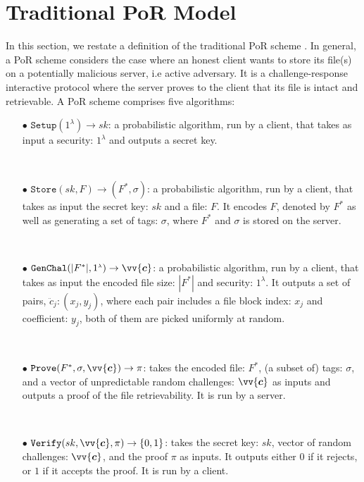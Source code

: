 \section {Traditional PoR Model}\label{PoR-Model}

In this section, we restate a  definition of the traditional PoR scheme \cite{DBLP:conf/asiacrypt/ShachamW08}. In general, a PoR scheme considers the case where an honest client wants to store its file(s) on a  potentially malicious server, i.e active adversary. It is a challenge-response interactive protocol where the server proves to the client that its file is intact and retrievable. A PoR scheme comprises five algorithms: 

\begin{itemize}
\item[$\bullet$] $\mathtt{Setup}(1^{\scriptscriptstyle\lambda})\rightarrow sk$:  a probabilistic algorithm, run by a client, that takes as input a security:  $1^{\scriptscriptstyle\lambda}$ and outputs a secret key.

\

\item[$\bullet$] $\mathtt{Store}(sk,F)\rightarrow (F^{*}, \sigma)$: a probabilistic algorithm, run by a client, that takes as input the secret key: $sk$ and a file: $F$. It encodes $F$, denoted by $F^{*}$ as well as generating a set of  tags: $\sigma$, where $F^{*}$ and  $\sigma$ is stored on the server.

\

\item[$\bullet$] $\mathtt{GenChal}(|F^{*}|, 1^{\scriptscriptstyle\lambda})\rightarrow \vv{\bm{c}}$: a probabilistic algorithm, run by a client, that takes as input the encoded file size: $|F^{*}|$ and security:  $1^{\scriptscriptstyle\lambda}$. It outputs a set of pairs, $\ddot{c}_{\scriptscriptstyle j}:(x_{\scriptscriptstyle j},y_{\scriptscriptstyle j})$, where each pair includes a file block index: $x_{\scriptscriptstyle j}$ and coefficient: $y_{\scriptscriptstyle j}$, both of them are picked uniformly at random.

\

\item[$\bullet$] $\mathtt{Prove}(F^{*}, \sigma, \vv{\bm{c}})\rightarrow \pi$:  takes the encoded file: $F^{*}$, (a subset of) tags: $\sigma$, and a vector of unpredictable random challenges: $\vv{\bm{c}}$ as inputs and outputs a proof of the file retrievability. It is run by a server.

\

\item[$\bullet$] $\mathtt{Verify}(sk,\vv{\bm{c}}, \pi)\rightarrow\{0,1\}$: takes the secret key: $sk$,  vector of random challenges: $\vv{\bm{c}}$, and the proof $\pi$ as inputs. It outputs either $0$ if it rejects,  or $1$ if it accepts the proof. It is run by a client.

\end{itemize}


